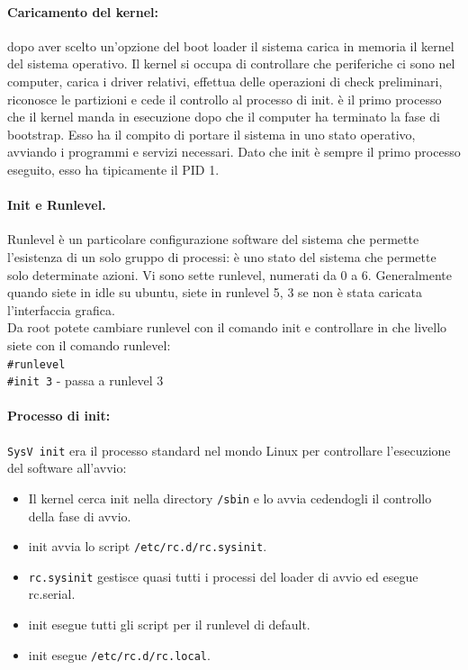 \documentclass[a4paper]{report}
\newcommand\tab[1][1cm]{\hspace*{#1}}
\begin{document}
\paragraph{Caricamento del kernel:} dopo aver scelto un’opzione del boot loader il
sistema carica in memoria il kernel del sistema
operativo. Il kernel si occupa di controllare che periferiche
ci sono nel computer, carica i driver relativi,
effettua delle operazioni di check preliminari,
riconosce le partizioni e cede il controllo al
processo di init. è il primo processo che il kernel manda in esecuzione dopo che il computer ha terminato la fase di bootstrap. Esso ha il compito di portare il sistema in uno stato operativo, avviando i programmi e servizi necessari.
Dato che init è sempre il primo processo eseguito, esso ha tipicamente il PID 1.
\paragraph{Init e Runlevel.} Runlevel è un particolare configurazione software del sistema
che permette l'esistenza di un solo gruppo di processi: è uno
stato del sistema che permette solo determinate azioni. Vi sono sette runlevel, numerati da 0 a 6. Generalmente quando siete in idle su ubuntu, siete in runlevel 5, 3 se non è stata caricata l'interfaccia grafica.\\
Da root potete cambiare runlevel con il comando init e
controllare in che livello siete con il comando runlevel:\\
\tab\texttt{\#runlevel}\\
\tab\texttt{\#init 3} - passa a runlevel 3\\
\paragraph{Processo di init:} \texttt{SysV init} era il processo standard nel mondo Linux per controllare l'esecuzione del software all'avvio:
\begin{itemize}
\item Il kernel cerca init nella directory \texttt{/sbin} e lo avvia
cedendogli il controllo della fase di avvio.
\item init avvia lo script \texttt{/etc/rc.d/rc.sysinit}.
\item \texttt{rc.sysinit} gestisce quasi tutti i processi del loader di avvio
ed esegue rc.serial.
\item init esegue tutti gli script per il runlevel di default.
\item init esegue \texttt{/etc/rc.d/rc.local}.
\end{itemize}
\end{document}
